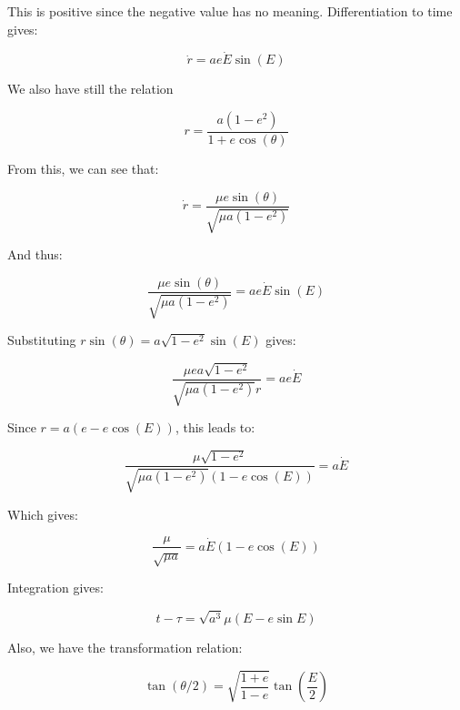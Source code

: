 This is positive since the negative value has no meaning.
Differentiation to time gives:

\begin{equation}
    \dot{r} = a e \dot{E} \sin{(E)}
\end{equation}

We also have still the relation

\begin{equation}
    r = \frac{a(1-e^2)}{1+e\cos{(\theta)}}
\end{equation}

From this, we can see that:

\begin{equation}
    \dot{r} = \frac{\mu e \sin{(\theta)}}{\sqrt{\mu a (1-e^2)}}
\end{equation}

And thus:

\begin{equation}
    \frac{\mu e \sin{(\theta)}}{\sqrt{\mu a(1-e^2)}} = a e \dot{E} \sin{(E)}
\end{equation}

Substituting $r \sin{(\theta)} = a \sqrt{1-e^2}\sin{(E)}$ gives:

\begin{equation}
    \frac{\mu e a \sqrt{1-e^2}}{\sqrt{\mu a(1-e^2)} r} = a e \dot{E}
\end{equation}

Since $r = a(e-e\cos{(E)})$, this leads to:

\begin{equation}
    \frac{\mu \sqrt{1-e^2}}{\sqrt{\mu a(1-e^2)}(1-e\cos{(E)})} = a \dot{E}
\end{equation}

Which gives:

\begin{equation}
    \frac{\mu}{\sqrt{\mu a}} = a \dot{E} (1-e\cos{(E)})
\end{equation}

Integration gives:

\begin{equation}
    t-\tau = \sqrt{a^3}{\mu} (E-e\sin{E})
\end{equation}

Also, we have the transformation relation:

\begin{equation}
    \tan{(\theta/2)} = \sqrt{\frac{1+e}{1-e}}\tan{(\frac{E}{2})}
\end{equation}

